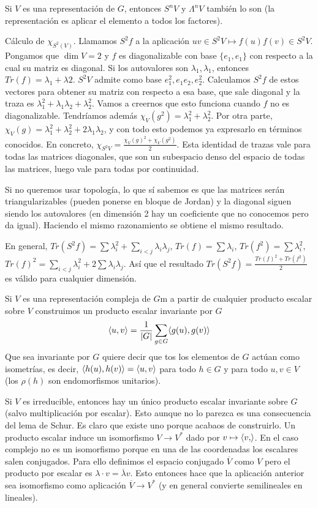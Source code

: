\documentclass[ANAyTR.tex]{subfiles}
\begin{document}
Si $V$ es una representación de $G$, entonces $S^nV$ y $\Lambda^nV$ también lo son (la representación es aplicar el elemento a todos los factores).


Cálculo de $\chi_{S^2(V)}$. Llamamos $S^2f$ a la aplicación $uv\in S^2V\mapsto f(u)f(v)\in S^2V$. Pongamos que $\dim V=2$ y $f$ es diagonalizable con base $\{e_1,e_1\}$ con respecto a la cual su matriz es diagonal. Si los autovalores son $\lambda_1,\lambda_1$, entonces $Tr(f)=\lambda_1+\lambda2$. $S^2V$ admite como base $e_1^2, e_1e_2, e_2^2$. Calculamos $S^2f$ de estos vectores para obtener su matriz con respecto a esa base, que sale diagonal y la traza es $\lambda_1^2+\lambda_1\lambda_2+\lambda_2^2$. Vamos a creernos que esto funciona cuando $f$ no es diagonalizable. Tendríamos además $\chi_V(g^2)=\lambda_1^2+\lambda_2^2$. Por otra parte, $\chi_V(g)=\lambda_1^2+\lambda_2^2+2\lambda_1\lambda_2$, y con todo esto podemos ya expresarlo en términos conocidos. En concreto, $\chi_{S^2V}=\frac{\chi_V(g)^2+\chi_V(g^2)}{2}$. Esta identidad de trazas vale para todas las matrices diagonales, que son un subespacio denso del espacio de todas las matrices, luego vale para todas por continuidad. 

Si no queremos usar topología, lo que sí sabemos es que las matrices serán triangularizables (pueden ponerse en bloque de Jordan) y la diagonal siguen siendo los autovalores (en dimensión 2 hay un coeficiente que no conocemos pero da igual). Haciendo el mismo razonamiento se obtiene el mismo resultado.

En general, $Tr(S^2f)=\sum\lambda_i^2+\sum_{i<j}\lambda_i\lambda_j$, $Tr(f)=\sum\lambda_i$, $Tr(f^2)=\sum\lambda_i^2$, $Tr(f)^2=\sum_{i<j}\lambda_i^2+2\sum\lambda_i\lambda_j$. Así que el resultado $Tr(S^2f)=\frac{Tr(f)^2+Tr(f^2)}{2}$ es válido para cualquier dimensión. 

Si $V$ es una representación compleja de $G$m a partir de cualquier producto escalar sobre $V$ construimos un producto escalar invariante por $G$
\[
\langle{u,v}\rangle=\frac{1}{|G|}\sum_{g\in G}\langle{g(u),g(v)}\rangle
\]
Que sea invariante por $G$ quiere decir que tos los elementos de $G$ actúan como isometrías, es decir, $\langle{h(u),h(v)}\rangle=\langle{u,v}\rangle$ para todo $h\in G$ y para todo $u,v\in V$ (los $\rho(h)$ son endomorfismos unitarios). 

Si $V$ es irreducible, entonces hay un único producto escalar invariante sobre $G$ (salvo multiplicación por escalar). Esto aunque no lo parezca es una consecuencia del lema de Schur. Es claro que existe uno porque acabaos de construirlo. Un producto escalar induce un isomorfismo $V\to V^*$ dado por $v\mapsto \langle{v,}\rangle$. En el caso complejo no es un isomorfismo porque en una de las coordenadas los escalares salen conjugados. Para ello definimos el espacio conjugado $\overline{V}$ como $V$ pero el producto por escalar es $\lambda\cdot v=\overline{\lambda}v$. Esto entonces hace que la aplicación anterior sea isomorfismo como aplicación $\overline{V}\to V^*$ (y en general convierte semilineales en lineales).
\end{document}
